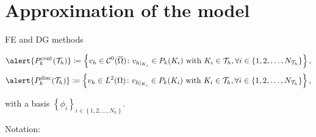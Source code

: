 \section{Approximation of the model}
\begin{frame}{FE and DG methods}
	\footnotesize
	\vspace*{-0.2cm}
	\begin{block}{}
		\begin{equation*}
			\alert{\Pc_k(\T_h)}\coloneqq\left\{v_h\in \mathcal{C}^0(\overline\Omega)\colon v_{h|_{K_i}}\in\mathbb{P}_k(K_i)\text{ with } K_i\in\T_h,\forall i\in\left\{1,2,\ldots,N_{\T_h}\right\}\right\},
		\end{equation*}
		\begin{equation*}
			\alert{\Pd_k(\T_h)}\coloneqq\left\{v_h\in L^2(\Omega)\colon v_{h|_{K_i}}\in\mathbb{P}_k(K_i)\text{ with } K_i\in\T_h,\forall i\in\left\{1,2,\ldots,N_{\T_h}\right\}\right\},
		\end{equation*}
	\end{block}
	with a basis $\left\{\phi_i\right\}_{i\in\left\{1,2,\ldots,N_h \right\}}$.
	
	\vspace*{0.3cm}
	Notation:
	

\end{frame}
